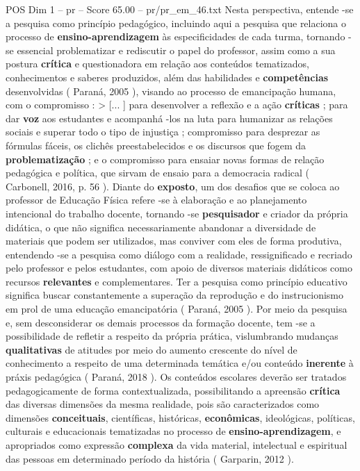 \begin{textsample}{POS Dim 1 – pr – Score 65.00 – pr/pr\_em\_46.txt}
Nesta perspectiva, entende -se a pesquisa como princípio pedagógico, incluindo aqui a pesquisa que relaciona o processo de \textbf{ensino-aprendizagem} às especificidades de cada turma, tornando -se essencial problematizar e rediscutir o papel do professor, assim como a sua postura \textbf{crítica} e questionadora em relação aos conteúdos tematizados, conhecimentos e saberes produzidos, além das habilidades e \textbf{competências} desenvolvidas ( Paraná, 2005 ), visando ao processo de emancipação humana, com o compromisso : > [... ] para desenvolver a reflexão e a ação \textbf{críticas} ; para dar \textbf{voz} aos estudantes e acompanhá -los na luta para humanizar as relações sociais e superar todo o tipo de injustiça ; compromisso para desprezar as fórmulas fáceis, os clichês preestabelecidos e os discursos que fogem da \textbf{problematização} ; e o compromisso para ensaiar novas formas de relação pedagógica e política, que sirvam de ensaio para a democracia radical ( Carbonell, 2016, p. 56 ).
Diante do \textbf{exposto}, um dos desafios que se coloca ao professor de Educação Física refere -se à elaboração e ao planejamento intencional do trabalho docente, tornando -se \textbf{pesquisador} e criador da própria didática, o que não significa necessariamente abandonar a diversidade de materiais que podem ser utilizados, mas conviver com eles de forma produtiva, entendendo -se a pesquisa como diálogo com a realidade, ressignificado e recriado pelo professor e pelos estudantes, com apoio de diversos materiais didáticos como recursos \textbf{relevantes} e complementares.
Ter a pesquisa como princípio educativo significa buscar constantemente a superação da reprodução e do instrucionismo em prol de uma educação emancipatória ( Paraná, 2005 ).
Por meio da pesquisa e, sem desconsiderar os demais processos da formação docente, tem -se a possibilidade de refletir a respeito da própria prática, vislumbrando mudanças \textbf{qualitativas} de atitudes por meio do aumento crescente do nível de conhecimento a respeito de uma determinada temática e/ou conteúdo \textbf{inerente} à práxis pedagógica ( Paraná, 2018 ).
Os conteúdos escolares deverão ser tratados pedagogicamente de forma contextualizada, possibilitando a apreensão \textbf{crítica} das diversas dimensões da mesma realidade, pois são caracterizados como dimensões \textbf{conceituais}, científicas, históricas, \textbf{econômicas}, ideológicas, políticas, culturais e educacionais tematizadas no processo de \textbf{ensino-aprendizagem}, e apropriados como expressão \textbf{complexa} da vida material, intelectual e espiritual das pessoas em determinado período da história ( Garparin, 2012 ).

\end{textsample}

